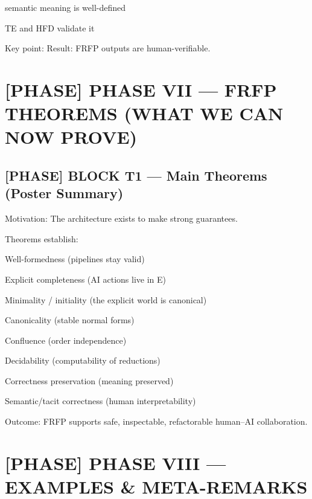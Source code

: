 semantic meaning is well-defined\par

TE and HFD validate it\par

Key point: Result: FRFP outputs are human-verifiable.\par

\section*{[PHASE] PHASE VII --- FRFP THEOREMS (WHAT WE CAN NOW PROVE)}

\subsection*{[PHASE] BLOCK T1 --- Main Theorems (Poster Summary)}

Motivation: The architecture exists to make strong guarantees.\par

Theorems establish:\par

Well-formedness (pipelines stay valid)\par

Explicit completeness (AI actions live in E)\par

Minimality / initiality (the explicit world is canonical)\par

Canonicality (stable normal forms)\par

Confluence (order independence)\par

Decidability (computability of reductions)\par

Correctness preservation (meaning preserved)\par

Semantic/tacit correctness (human interpretability)\par

 Outcome: FRFP supports safe, inspectable, refactorable human--AI collaboration.\par

\section*{[PHASE] PHASE VIII --- EXAMPLES \& META-REMARKS}

